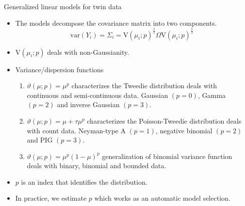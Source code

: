 \documentclass[
  ignorenonframetext,
  serif,
  professionalfont,
  usenames,
  dvipsnames,
  aspectratio = 169]{beamer}
\providecommand{\tightlist}{%
  \setlength{\itemsep}{0pt}\setlength{\parskip}{0pt}}
\renewcommand{\tightlist}{%
  \setlength{\itemsep}{0\baselineskip}
  \setlength{\parskip}{0.25\baselineskip}
}
\begin{document}
\begin{frame}{Generalized linear models for twin data}
\protect\hypertarget{generalized-linear-models-for-twin-data-1}{}
\begin{itemize}
\tightlist
\item
  The models decompose the covariance matrix into two components.
  \[ \mathrm{var}(Y_i) = \Sigma_i = \mathrm{V}(\mu_i;p)^{\frac{1}{2}}\Omega\mathrm{V}(\mu_i;p)^{\frac{1}{2}}\]
\item
  \(\mathrm{V}(\mu_i;p)\) deals with non-Gaussianity.
\item
  Variance/dispersion functions

  \begin{enumerate}
  \tightlist
  \item
    \(\vartheta(\mu;p) = \mu^p\) characterizes the Tweedie distribution
    deals with continuous and semi-continuous data. Gaussian \((p=0)\),
    Gamma \((p=2)\) and inverse Gaussian \((p=3)\).
  \item
    \(\vartheta(\mu;p) = \mu + \tau \mu^p\) characterizes the
    Poisson-Tweedie distribution deals with count data. Neyman-type A
    \((p=1)\), negative binomial \((p=2)\) and PIG \((p=3)\).
  \item
    \(\vartheta(\mu;p) = \mu^p (1- \mu)^p\) generalization of binomial
    variance function deals with binary, binomial and bounded data.
  \end{enumerate}
\item
  \(p\) is an index that identifies the distribution.
\item
  In practice, we estimate \(p\) which works as an automatic model
  selection.
\end{itemize}
\end{frame}
\end{document}
